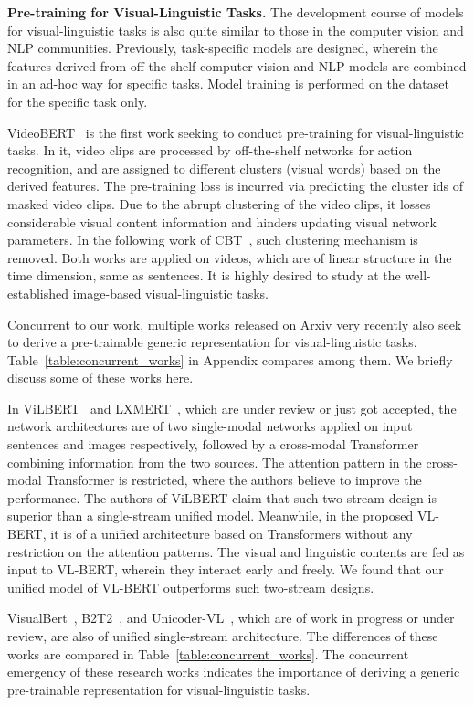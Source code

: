 \documentclass{article} \usepackage{iclr2020_conference,times}
\begin{document}
\textbf{Pre-training for Visual-Linguistic Tasks.} The development course of models for visual-linguistic tasks is also quite similar to those in the computer vision and NLP communities. Previously, task-specific models are designed, wherein the features derived from off-the-shelf computer vision and NLP models are combined in an ad-hoc way for specific tasks. Model training is performed on the dataset for the specific task only. 


VideoBERT~\citep{sun2019videobert} is the first work seeking to conduct pre-training for visual-linguistic tasks. In it, video clips are processed by off-the-shelf networks for action recognition, and are assigned to different clusters (visual words) based on the derived features. The pre-training loss is incurred via predicting the cluster ids of masked video clips. Due to the abrupt clustering of the video clips, it losses considerable visual content information and hinders updating visual network parameters. In the following work of CBT~\citep{sun2019contrastive}, such clustering mechanism is removed. Both works are applied on videos, which are of linear structure in the time dimension, same as sentences. It is highly desired to study at the well-established image-based visual-linguistic tasks.



Concurrent to our work, multiple works released on Arxiv very recently also seek to derive a pre-trainable generic representation for visual-linguistic tasks. Table~\ref{table:concurrent_works} in Appendix compares among them. We briefly discuss some of these works here. 


In ViLBERT~\citep{lu2019vilbert} and LXMERT~\citep{tan2019lxmert}, which are under review or just got accepted, the network architectures are of two single-modal networks applied on input sentences and images respectively, followed by a cross-modal Transformer combining information from the two sources. The attention pattern in the cross-modal Transformer is restricted, where the authors believe to improve the performance. The authors of ViLBERT claim that such two-stream design is superior than a single-stream unified model. Meanwhile, in the proposed VL-BERT, it is of a unified architecture based on Transformers without any restriction on the attention patterns. The visual and linguistic contents are fed as input to VL-BERT, wherein they interact early and freely. We found that our unified model of VL-BERT outperforms such two-stream designs. 


VisualBert~\citep{li2019visualbert}, B2T2~\citep{alberti2019fusion}, and Unicoder-VL~\citep{li2019unicodervl}, which are of work in progress or under review, are also of unified single-stream architecture. The differences of these works are compared in Table~\ref{table:concurrent_works}. The concurrent emergency of these research works indicates the importance of deriving a generic pre-trainable representation for visual-linguistic tasks.
\end{document}
